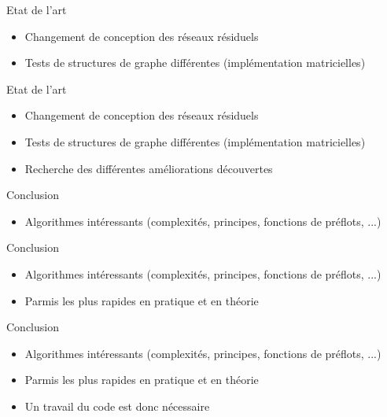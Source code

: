 \documentclass[hyperref={},
xcolor={dvipsnames,svgnames,table},10pt]{beamer}
\begin{document}
\begin{frame}{Etat de l'art}
	\begin{itemize}
		\item Changement de conception des réseaux résiduels
		\item Tests de structures de graphe différentes (implémentation matricielles)
	\end{itemize}
\end{frame}

\begin{frame}{Etat de l'art}
	\begin{itemize}
		\item Changement de conception des réseaux résiduels
		\item Tests de structures de graphe différentes (implémentation matricielles)
		\item Recherche des différentes améliorations découvertes
	\end{itemize}
\end{frame}

\begin{frame}{Conclusion}
	\begin{itemize}
		\item Algorithmes intéressants (complexités, principes, fonctions de préflots, ...)
	\end{itemize}
\end{frame}

\begin{frame}{Conclusion}
	\begin{itemize}
		\item Algorithmes intéressants (complexités, principes, fonctions de préflots, ...)
		\item Parmis les plus rapides en pratique et en théorie
	\end{itemize}
\end{frame}

\begin{frame}{Conclusion}
	\begin{itemize}
		\item Algorithmes intéressants (complexités, principes, fonctions de préflots, ...)
		\item Parmis les plus rapides en pratique et en théorie
		\item Un travail du code est donc nécessaire
	\end{itemize}
\end{frame}
\end{document}
